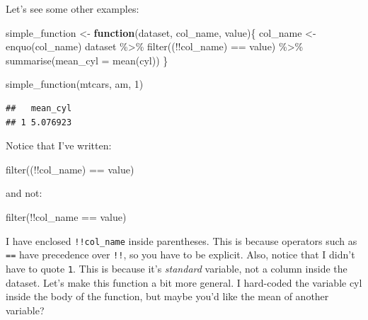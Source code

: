 \documentclass[
]{article}
\newenvironment{Shaded}{\begin{snugshade}}{\end{snugshade}}
\newcommand{\AttributeTok}[1]{\textcolor[rgb]{0.77,0.63,0.00}{#1}}
\newcommand{\ControlFlowTok}[1]{\textcolor[rgb]{0.13,0.29,0.53}{\textbf{#1}}}
\newcommand{\DecValTok}[1]{\textcolor[rgb]{0.00,0.00,0.81}{#1}}
\newcommand{\FunctionTok}[1]{\textcolor[rgb]{0.00,0.00,0.00}{#1}}
\newcommand{\NormalTok}[1]{#1}
\newcommand{\OtherTok}[1]{\textcolor[rgb]{0.56,0.35,0.01}{#1}}
\newcommand{\SpecialCharTok}[1]{\textcolor[rgb]{0.00,0.00,0.00}{#1}}
\begin{document}
Let's see some other examples:

\begin{Shaded}
\begin{Highlighting}[]
\NormalTok{simple\_function }\OtherTok{\textless{}{-}} \ControlFlowTok{function}\NormalTok{(dataset, col\_name, value)\{}
\NormalTok{  col\_name }\OtherTok{\textless{}{-}} \FunctionTok{enquo}\NormalTok{(col\_name)}
\NormalTok{  dataset }\SpecialCharTok{\%\textgreater{}\%}
    \FunctionTok{filter}\NormalTok{((}\SpecialCharTok{!!}\NormalTok{col\_name) }\SpecialCharTok{==}\NormalTok{ value) }\SpecialCharTok{\%\textgreater{}\%}
    \FunctionTok{summarise}\NormalTok{(}\AttributeTok{mean\_cyl =} \FunctionTok{mean}\NormalTok{(cyl))}
\NormalTok{\}}


\FunctionTok{simple\_function}\NormalTok{(mtcars, am, }\DecValTok{1}\NormalTok{)}
\end{Highlighting}
\end{Shaded}

\begin{verbatim}
##   mean_cyl
## 1 5.076923
\end{verbatim}

Notice that I've written:

\begin{Shaded}
\begin{Highlighting}[]
\FunctionTok{filter}\NormalTok{((}\SpecialCharTok{!!}\NormalTok{col\_name) }\SpecialCharTok{==}\NormalTok{ value)}
\end{Highlighting}
\end{Shaded}

and not:

\begin{Shaded}
\begin{Highlighting}[]
\FunctionTok{filter}\NormalTok{(}\SpecialCharTok{!!}\NormalTok{col\_name }\SpecialCharTok{==}\NormalTok{ value)}
\end{Highlighting}
\end{Shaded}

I have enclosed \texttt{!!col\_name} inside parentheses. This is because operators such as \texttt{==} have
precedence over \texttt{!!}, so you have to be explicit. Also, notice that I didn't have to quote \texttt{1}.
This is because it's \emph{standard} variable, not a column inside the dataset. Let's make this function
a bit more general. I hard-coded the variable cyl inside the body of the function, but maybe you'd
like the mean of another variable?
\end{document}
